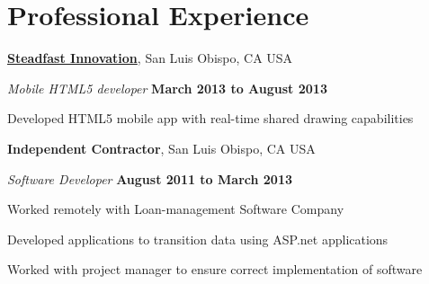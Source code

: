 \documentclass[10pt]{article}
\begin{document}
\section{Professional Experience}

%
%


\href{http://steadfastinnovation.com/}{\textbf{Steadfast Innovation}},
San Luis Obispo, CA USA
\begin{outerlist}
\item[] \textit{Mobile HTML5 developer}%
    \hfill \textbf{March 2013 to August 2013}%
    \begin{innerlist}
    \item Developed HTML5 mobile app with real-time shared drawing capabilities 
    \end{innerlist}
\end{outerlist}

\halfblankline


{\textbf{Independent Contractor}}, San Luis Obispo, CA USA
\begin{outerlist}
\item[] \textit{Software Developer}%
    \hfill \textbf{August 2011 to March 2013}
    \begin{innerlist}%
    \item Worked remotely with Loan-management Software Company
    \item Developed applications to transition data using ASP.net applications
    \item Worked with project manager to ensure correct implementation of software
\end{innerlist}

\end{outerlist}
\end{document}

